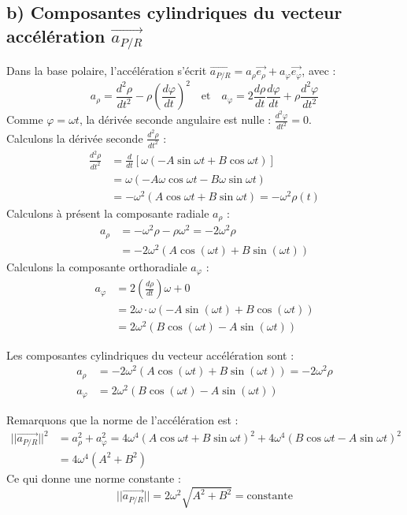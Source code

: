 \documentclass[11pt,a4paper]{article}
\begin{document}
\subsection*{b) Composantes cylindriques du vecteur accélération $\vec{a_{P/R}}$}
Dans la base polaire, l'accélération s'écrit $\vec{a_{P/R}} = a_\rho \vec{e_\rho} + a_\varphi \vec{e_\varphi}$, avec :
$$ a_\rho = \frac{d^2\rho}{dt^2} - \rho \left(\frac{d\varphi}{dt}\right)^2 \quad \text{et} \quad a_\varphi = 2\frac{d\rho}{dt}\frac{d\varphi}{dt} + \rho\frac{d^2\varphi}{dt^2} $$
Comme $\varphi = \omega t$, la dérivée seconde angulaire est nulle : $\frac{d^2\varphi}{dt^2} = 0$. \\
Calculons la dérivée seconde $\frac{d^2\rho}{dt^2}$ :
\begin{align*}
\frac{d^2\rho}{dt^2} &= \frac{d}{dt}\left[\omega(-A\sin\omega t + B\cos\omega t)\right] \\
&= \omega(-A\omega\cos\omega t - B\omega\sin\omega t) \\
&= -\omega^2 (A\cos\omega t + B\sin\omega t) = -\omega^2 \rho(t)
\end{align*}
Calculons à présent la composante radiale $a_\rho$ :
\begin{align*}
a_\rho &= -\omega^2 \rho - \rho \omega^2 = -2\omega^2 \rho \\
&= -2\omega^2 (A\cos(\omega t) + B\sin(\omega t))
\end{align*}
Calculons la composante orthoradiale $a_\varphi$ :
\begin{align*}
a_\varphi &= 2 \left(\frac{d\rho}{dt}\right) \omega + 0 \\
&= 2\omega \cdot \omega (-A\sin(\omega t) + B\cos(\omega t)) \\
&= 2\omega^2 (B\cos(\omega t) - A\sin(\omega t))
\end{align*}

\begin{sonucbox}
Les composantes cylindriques du vecteur accélération sont :
\begin{align*}
a_\rho &= -2\omega^2 (A\cos(\omega t) + B\sin(\omega t)) = -2\omega^2 \rho \\
a_\varphi &= 2\omega^2 (B\cos(\omega t) - A\sin(\omega t))
\end{align*}
\end{sonucbox}

Remarquons que la norme de l'accélération est :
\begin{align*}
||\vec{a_{P/R}}||^2 &= a_\rho^2 + a_\varphi^2 = 4\omega^4 (A\cos\omega t + B\sin\omega t)^2 + 4\omega^4 (B\cos\omega t - A\sin\omega t)^2 \\
&= 4\omega^4 (A^2 + B^2)
\end{align*}
Ce qui donne une norme constante :
$$ ||\vec{a_{P/R}}|| = 2\omega^2 \sqrt{A^2 + B^2} = \text{constante} $$
\end{document}
